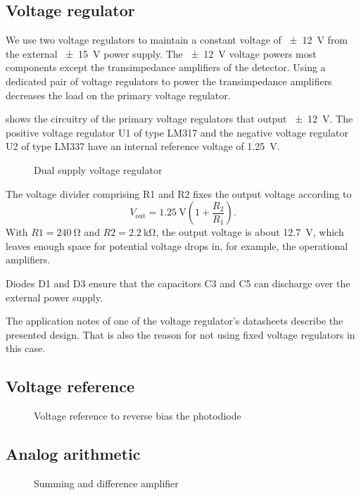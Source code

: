 \subsection{Voltage regulator}

We use two voltage regulators to maintain a constant voltage of \SI{\pm12}{\volt} from the external \SI{\pm15}{\volt} power supply. The \SI{\pm12}{\volt} voltage powers most components except the transimpedance amplifiers of the detector.
Using a dedicated pair of voltage regulators to power the transimpedance amplifiers decreases the load on the primary voltage regulator.

 shows the circuitry of the primary voltage regulators that output \SI{\pm12}{\volt}.
The positive voltage regulator U1 of type LM317 and the negative voltage regulator U2 of type LM337 have an internal reference voltage of \SI{1.25}{\volt}.

\begin{figure}[H]
	\centering
	
	\caption{Dual supply voltage regulator}\label{fig:voltage_regulator}
\end{figure}

The voltage divider comprising R1 and R2 fixes the output voltage according to
\begin{equation}
	V_\text{out}=\SI{1.25}{\volt}\left(1+\frac{R_2}{R_1}\right).
\end{equation}
With $R1 = \SI{240}{\ohm}$ and $R2 = \SI{2.2}{\kilo\ohm}$, the output voltage is about \SI{12.7}{\volt}, which leaves enough space for potential voltage drops in, for example, the operational amplifiers.

Diodes D1 and D3 ensure that the capacitors C3 and C5 can discharge over the external power supply.

The application notes of one of the voltage regulator's datasheets describe the presented design.
That is also the reason for not using fixed voltage regulators in this case.

\subsection{Voltage reference}

\begin{figure}[H]
	\centering
	
	\caption{Voltage reference to reverse bias the photodiode}\label{fig:voltage_reference}
\end{figure}

\subsection{Analog arithmetic}

\begin{figure}[H]
	\centering
	
	\caption{Summing and difference amplifier}\label{fig:amplifier_arithmetic}
\end{figure}
